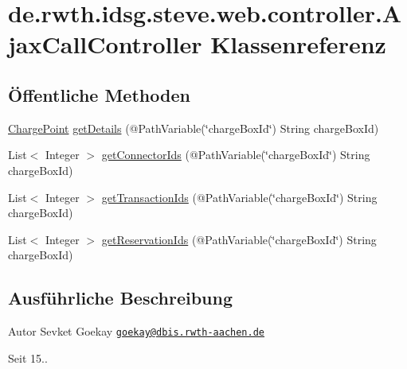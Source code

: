 \hypertarget{classde_1_1rwth_1_1idsg_1_1steve_1_1web_1_1controller_1_1_ajax_call_controller}{\section{de.\-rwth.\-idsg.\-steve.\-web.\-controller.\-Ajax\-Call\-Controller Klassenreferenz}
\label{classde_1_1rwth_1_1idsg_1_1steve_1_1web_1_1controller_1_1_ajax_call_controller}
}
\subsection*{Öffentliche Methoden}
\begin{DoxyCompactItemize}
\item 
\hyperlink{classde_1_1rwth_1_1idsg_1_1steve_1_1repository_1_1dto_1_1_charge_point}{Charge\-Point} \hyperlink{classde_1_1rwth_1_1idsg_1_1steve_1_1web_1_1controller_1_1_ajax_call_controller_a3a249a9846dbef35c866f56f1cd7f70b}{get\-Details} (@Path\-Variable(\char`\"{}charge\-Box\-Id\char`\"{}) String charge\-Box\-Id)
\item 
List$<$ Integer $>$ \hyperlink{classde_1_1rwth_1_1idsg_1_1steve_1_1web_1_1controller_1_1_ajax_call_controller_a09f444d52215fc760202c542a5612702}{get\-Connector\-Ids} (@Path\-Variable(\char`\"{}charge\-Box\-Id\char`\"{}) String charge\-Box\-Id)
\item 
List$<$ Integer $>$ \hyperlink{classde_1_1rwth_1_1idsg_1_1steve_1_1web_1_1controller_1_1_ajax_call_controller_a918ce2fa237aa28796ad8f18d3a7e8b5}{get\-Transaction\-Ids} (@Path\-Variable(\char`\"{}charge\-Box\-Id\char`\"{}) String charge\-Box\-Id)
\item 
List$<$ Integer $>$ \hyperlink{classde_1_1rwth_1_1idsg_1_1steve_1_1web_1_1controller_1_1_ajax_call_controller_acf3eb88059e229d7623fe6c3b3895cad}{get\-Reservation\-Ids} (@Path\-Variable(\char`\"{}charge\-Box\-Id\char`\"{}) String charge\-Box\-Id)
\end{DoxyCompactItemize}


\subsection{Ausführliche Beschreibung}
\begin{DoxyAuthor}{Autor}
Sevket Goekay \href{mailto:goekay@dbis.rwth-aachen.de}{\tt goekay@dbis.\-rwth-\/aachen.\-de} 
\end{DoxyAuthor}
\begin{DoxySince}{Seit}
15.. 
\end{DoxySince}



